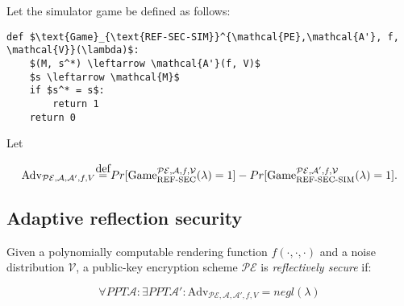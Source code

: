 \documentclass{article}
\newcommand\defeq{\stackrel{\mathclap{\normalfont\mbox{def}}}{=}}
\begin{document}
Let the simulator game be defined as follows:

\begin{lstlisting}[texcl,mathescape]
def $\text{Game}_{\text{REF-SEC-SIM}}^{\mathcal{PE},\mathcal{A'}, f,
\mathcal{V}}(\lambda)$:
    $(M, s^*) \leftarrow \mathcal{A'}(f, V)$
    $s \leftarrow \mathcal{M}$
    if $s^* = s$:
        return 1
    return 0
\end{lstlisting}

Let

\begin{equation*}
    \text{Adv}_{\mathcal{PE}, \mathcal{A}, \mathcal{A}', f, V}
    \defeq
    Pr[\text{Game}_{\text{REF-SEC}}^{\mathcal{PE},\mathcal{A}, f,
\mathcal{V}}(\lambda) = 1]
    -
    Pr[\text{Game}_{\text{REF-SEC-SIM}}^{\mathcal{PE},\mathcal{A'}, f,
\mathcal{V}}(\lambda) = 1].
\end{equation*}

\subsection*{Adaptive reflection security}

Given a polynomially computable rendering function $f(\cdot, \cdot, \cdot)$ and
a  noise distribution $\mathcal{V}$, a public-key encryption scheme
$\mathcal{PE}$ is \textit{reflectively secure} if:

\begin{equation*}
\forall PPT \mathcal{A}: \exists PPT \mathcal{A}': \text{Adv}_{\mathcal{PE}, \mathcal{A}, \mathcal{A}', f, V} = negl(\lambda)
\end{equation*}
\end{document}
